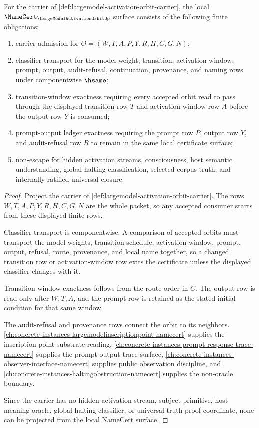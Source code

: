 \begin{theorem}
\label{thm:largemodel-activation-orbit-namecert-obligations}
For the carrier of \autoref{def:largemodel-activation-orbit-carrier}, the local $\NameCert_{\LargeModelActivationOrbitUp}$ surface consists of the following finite obligations:
\begin{enumerate}
\item carrier admission for $O=(W,T,A,P,Y,R,H,C,G,N)$;
\item classifier transport for the model-weight, transition, activation-window, prompt, output, audit-refusal, continuation, provenance, and naming rows under componentwise $\hsame$;
\item transition-window exactness requiring every accepted orbit read to pass through the displayed transition row $T$ and activation-window row $A$ before the output row $Y$ is consumed;
\item prompt-output ledger exactness requiring the prompt row $P$, output row $Y$, and audit-refusal row $R$ to remain in the same local certificate surface;
\item non-escape for hidden activation streams, consciousness, host semantic understanding, global halting classification, selected corpus truth, and internally ratified universal closure.
\end{enumerate}
\end{theorem}
\begin{proof}
Project the carrier of \autoref{def:largemodel-activation-orbit-carrier}. The rows $W,T,A,P,Y,R,H,C,G,N$ are the whole packet, so any accepted consumer starts from these displayed finite rows.

Classifier transport is componentwise. A comparison of accepted orbits must transport the model weights, transition schedule, activation window, prompt, output, refusal, route, provenance, and local name together, so a changed transition row or activation-window row exits the certificate unless the displayed classifier changes with it.

Transition-window exactness follows from the route order in $C$. The output row is read only after $W,T,A$, and the prompt row is retained as the stated initial condition for that same window.

The audit-refusal and provenance rows connect the orbit to its neighbors. \autoref{ch:concrete-instances-largemodelinscriptionpoint-namecert} supplies the inscription-point substrate reading, \autoref{ch:concrete-instances-prompt-response-trace-namecert} supplies the prompt-output trace surface, \autoref{ch:concrete-instances-observer-interface-namecert} supplies public observation discipline, and \autoref{ch:concrete-instances-haltingobstruction-namecert} supplies the non-oracle boundary.

Since the carrier has no hidden activation stream, subject primitive, host meaning oracle, global halting classifier, or universal-truth proof coordinate, none can be projected from the local NameCert surface.
\end{proof}

